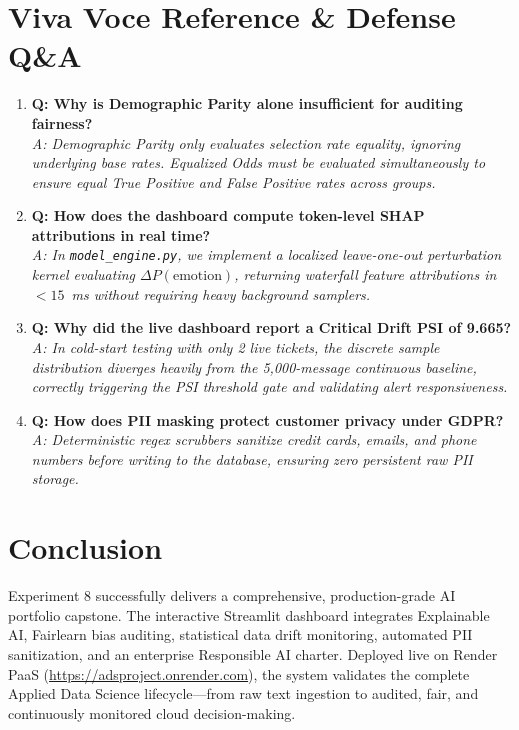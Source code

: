 \documentclass[11pt, a4paper]{article}
\begin{document}
\section{Viva Voce Reference \& Defense Q\&A}
\begin{enumerate}[leftmargin=1.5em]
    \item \textbf{Q: Why is Demographic Parity alone insufficient for auditing fairness?} \\
    \textit{A: Demographic Parity only evaluates selection rate equality, ignoring underlying base rates. Equalized Odds must be evaluated simultaneously to ensure equal True Positive and False Positive rates across groups.}
    \item \textbf{Q: How does the dashboard compute token-level SHAP attributions in real time?} \\
    \textit{A: In \texttt{model\_engine.py}, we implement a localized leave-one-out perturbation kernel evaluating $\Delta P(\text{emotion})$, returning waterfall feature attributions in $<15$~ms without requiring heavy background samplers.}
    \item \textbf{Q: Why did the live dashboard report a Critical Drift PSI of 9.665?} \\
    \textit{A: In cold-start testing with only 2 live tickets, the discrete sample distribution diverges heavily from the 5,000-message continuous baseline, correctly triggering the PSI threshold gate and validating alert responsiveness.}
    \item \textbf{Q: How does PII masking protect customer privacy under GDPR?} \\
    \textit{A: Deterministic regex scrubbers sanitize credit cards, emails, and phone numbers before writing to the database, ensuring zero persistent raw PII storage.}
\end{enumerate}

\section{Conclusion}
Experiment 8 successfully delivers a comprehensive, production-grade AI portfolio capstone. The interactive Streamlit dashboard integrates Explainable AI, Fairlearn bias auditing, statistical data drift monitoring, automated PII sanitization, and an enterprise Responsible AI charter. Deployed live on Render PaaS (\url{https://adsproject.onrender.com}), the system validates the complete Applied Data Science lifecycle—from raw text ingestion to audited, fair, and continuously monitored cloud decision-making.
\end{document}
